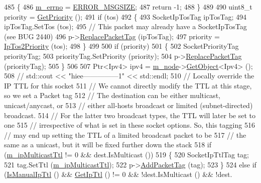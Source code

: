 \begin{DoxyCode}
485     \{
486       \hyperlink{classns3_1_1UdpSocketImpl_ac35998e8aa2cc588e21752944b0a0095}{m\_errno} = \hyperlink{classns3_1_1Socket_ada1328c5ae0c28cb2a982caf8f6d6ccaaeba174dbfeaed34194ce9463f6a469f1}{ERROR\_MSGSIZE};
487       \textcolor{keywordflow}{return} -1;
488     \}
489 
490   uint8\_t priority = \hyperlink{classns3_1_1Socket_a3e4788d61c0e841ccaa1c7fce6fda2c1}{GetPriority} ();
491   \textcolor{keywordflow}{if} (tos)
492     \{
493       SocketIpTosTag ipTosTag;
494       ipTosTag.SetTos (tos);
495       \textcolor{comment}{// This packet may already have a SocketIpTosTag (see BUG 2440)}
496       p->\hyperlink{classns3_1_1Packet_afb014ae9f4adddbfc51c64b085bfd405}{ReplacePacketTag} (ipTosTag);
497       priority = \hyperlink{classns3_1_1Socket_a81564620cc94d291f1dc5d79b2f13b4a}{IpTos2Priority} (tos);
498     \}
499 
500   \textcolor{keywordflow}{if} (priority)
501     \{
502       SocketPriorityTag priorityTag;
503       priorityTag.SetPriority (priority);
504       p->\hyperlink{classns3_1_1Packet_afb014ae9f4adddbfc51c64b085bfd405}{ReplacePacketTag} (priorityTag);
505     \}
506 
507   Ptr<Ipv4> ipv4 = \hyperlink{classns3_1_1UdpSocketImpl_af6a19247be3d8917b582af77337730c3}{m\_node}->\hyperlink{classns3_1_1Object_a13e18c00017096c8381eb651d5bd0783}{GetObject}<Ipv4> ();
508  \textcolor{comment}{// std::cout << "hiee---------------1" << std::endl;}
510 \textcolor{comment}{}  \textcolor{comment}{// Locally override the IP TTL for this socket}
511   \textcolor{comment}{// We cannot directly modify the TTL at this stage, so we set a Packet tag}
512   \textcolor{comment}{// The destination can be either multicast, unicast/anycast, or}
513   \textcolor{comment}{// either all-hosts broadcast or limited (subnet-directed) broadcast.}
514   \textcolor{comment}{// For the latter two broadcast types, the TTL will later be set to one}
515   \textcolor{comment}{// irrespective of what is set in these socket options.  So, this tagging}
516   \textcolor{comment}{// may end up setting the TTL of a limited broadcast packet to be}
517   \textcolor{comment}{// the same as a unicast, but it will be fixed further down the stack}
518   \textcolor{keywordflow}{if} (\hyperlink{classns3_1_1UdpSocketImpl_a4849465356cef8573ed373d12a5a62ec}{m\_ipMulticastTtl} != 0 && dest.IsMulticast ())
519     \{
520       SocketIpTtlTag tag;
521       tag.SetTtl (\hyperlink{classns3_1_1UdpSocketImpl_a4849465356cef8573ed373d12a5a62ec}{m\_ipMulticastTtl});
522       p->\hyperlink{classns3_1_1Packet_a7400b8655852f5271c5957250d0141af}{AddPacketTag} (tag);
523     \}
524   \textcolor{keywordflow}{else} \textcolor{keywordflow}{if} (\hyperlink{classns3_1_1Socket_afbbd0ecd7cda631cafc80eda33aa0b2c}{IsManualIpTtl} () && \hyperlink{classns3_1_1Socket_adf6420d12b8a0b6a20e46c37fe48830d}{GetIpTtl} () != 0 && !dest.IsMulticast () && !dest.

\end{DoxyCode}
